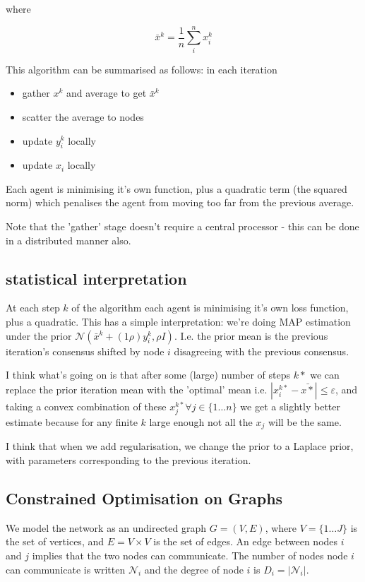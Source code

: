 \documentclass{article}
\begin{document}
where

\begin{equation}
\bar{x}^k = \frac{1}{n} \sum_i^n x_i^k
\end{equation}

This algorithm can be summarised as follows: in each iteration

\begin{itemize}
\item gather \(x^k\) and average to get \(\bar{x}^k\)
\item scatter the average to nodes
\item update \(y_i^k\) locally
\item update \(x_i\) locally
\end{itemize}

Each agent is minimising it's own function, plus a quadratic term (the squared norm) which penalises the agent from moving too far from the previous average.

Note that the 'gather' stage doesn't require a central processor - this can be done in a distributed manner also.

\subsection{statistical interpretation}
At each step \(k\) of the algorithm each agent is minimising it's own loss function, plus a quadratic.
This has a simple interpretation: we're doing MAP estimation under the prior \(\mathcal{N}\left(\bar{x}^{k} + \left(1\rho\right)y_i^k, \rho I\right)\). I.e. the prior mean is the previous iteration's consensus shifted by node \(i\) disagreeing with the previous consensus. 

I think what's going on is that after some (large) number of steps \(k*\) we can replace the prior iteration mean with the 'optimal' mean i.e. \(|x_i^{k*} - \bar{x*}| \leq \varepsilon \), and taking a convex combination of these \(x_j^{k*} \forall j \in \{1\ldots n\}\) we get a slightly better estimate because for any finite \(k\) large enough not all the \(x_j\) will be the same.

I think that when we add regularisation, we change the prior to a Laplace prior, with parameters corresponding to the previous iteration. 

\subsection{Constrained Optimisation on Graphs}
We model the network as an undirected graph \(G = \left(V,E\right)\), where \(V = \{1 \ldots J\}\) is the set of vertices, and \(E = V \times V\) is the set of edges. An edge between nodes \(i\) and \(j\) implies that the two nodes can communicate. The number of nodes node \(i\) can communicate is written \(\mathcal{N}_i\) and the degree of node \(i\) is \(D_i = |\mathcal{N}_i|\). 
\end{document}
